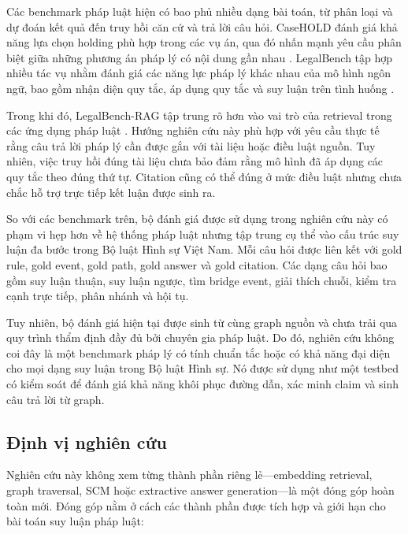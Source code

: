 Các benchmark pháp luật hiện có bao phủ nhiều dạng bài toán, từ phân loại
và dự đoán kết quả đến truy hồi căn cứ và trả lời câu hỏi. CaseHOLD đánh giá
khả năng lựa chọn holding phù hợp trong các vụ án, qua đó nhấn mạnh yêu cầu
phân biệt giữa những phương án pháp lý có nội dung gần nhau
\cite{zheng2021casehold}. LegalBench tập hợp nhiều tác vụ nhằm đánh giá các
năng lực pháp lý khác nhau của mô hình ngôn ngữ, bao gồm nhận diện quy tắc,
áp dụng quy tắc và suy luận trên tình huống
\cite{guha2023legalbench}.

Trong khi đó, LegalBench-RAG tập trung rõ hơn vào vai trò của retrieval
trong các ứng dụng pháp luật \cite{alami2024legalbenchrags}. Hướng nghiên
cứu này phù hợp với yêu cầu thực tế rằng câu trả lời pháp lý cần được gắn
với tài liệu hoặc điều luật nguồn. Tuy nhiên, việc truy hồi đúng tài liệu
chưa bảo đảm rằng mô hình đã áp dụng các quy tắc theo đúng thứ tự. Citation
cũng có thể đúng ở mức điều luật nhưng chưa chắc hỗ trợ trực tiếp kết luận
được sinh ra.

So với các benchmark trên, bộ đánh giá được sử dụng trong nghiên cứu này có
phạm vi hẹp hơn về hệ thống pháp luật nhưng tập trung cụ thể vào cấu trúc
suy luận đa bước trong Bộ luật Hình sự Việt Nam. Mỗi câu hỏi được liên kết
với gold rule, gold event, gold path, gold answer và gold citation. Các dạng
câu hỏi bao gồm suy luận thuận, suy luận ngược, tìm bridge event, giải thích
chuỗi, kiểm tra cạnh trực tiếp, phân nhánh và hội tụ.

Tuy nhiên, bộ đánh giá hiện tại được sinh từ cùng graph nguồn và chưa trải
qua quy trình thẩm định đầy đủ bởi chuyên gia pháp luật. Do đó, nghiên cứu
không coi đây là một benchmark pháp lý có tính chuẩn tắc hoặc có khả năng
đại diện cho mọi dạng suy luận trong Bộ luật Hình sự. Nó được sử dụng như
một testbed có kiểm soát để đánh giá khả năng khôi phục đường dẫn, xác minh
claim và sinh câu trả lời từ graph.

\subsection{Định vị nghiên cứu}

Nghiên cứu này không xem từng thành phần riêng lẻ---embedding retrieval,
graph traversal, SCM hoặc extractive answer generation---là một đóng góp
hoàn toàn mới. Đóng góp nằm ở cách các thành phần được tích hợp và giới hạn
cho bài toán suy luận pháp luật:

